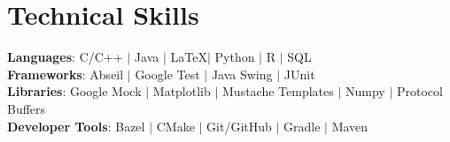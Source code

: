 \documentclass[letterpaper,11pt]{article}
\begin{document}
%
\section{Technical Skills}
 \begin{itemize}[leftmargin=0.15in, label={}]
    \small{\item{
     \textbf{Languages}{: C/C++ $|$ Java $|$ \LaTeX $|$ Python $|$ R $|$ SQL} \\
     \textbf{Frameworks}{: Abseil $|$ Google Test $|$ Java Swing $|$ JUnit} \\
     \textbf{Libraries}{: Google Mock $|$ Matplotlib $|$ Mustache Templates $|$ Numpy $|$ Protocol Buffers} \\
     \textbf{Developer Tools}{: Bazel $|$ CMake $|$ Git/GitHub $|$ Gradle $|$ Maven}
    }}
 \end{itemize}


\end{document}
